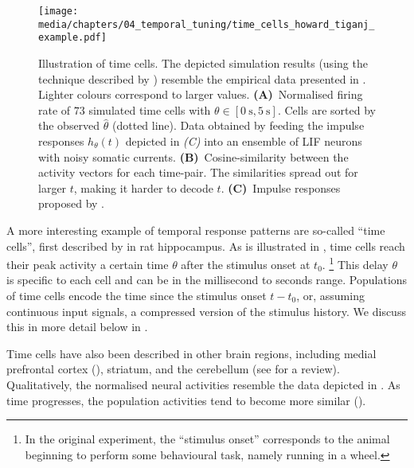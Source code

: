 \begin{figure}
	\centering
	\texttt{[image: media/chapters/04\_temporal\_tuning/time\_cells\_howard\_tiganj\_example.pdf]}%
	{\label{fig:time_cells_howard_tiganj_example_a}}%
	{\label{fig:time_cells_howard_tiganj_example_b}}%
	{\label{fig:time_cells_howard_tiganj_example_c}}%
	\caption[Illustration of time cells]{
		Illustration of time cells.
		The depicted simulation results (using the technique described by \cite{howard2014unified}) resemble the empirical data presented in \citet{tiganj2016sequential}.
		Lighter colours correspond to larger values.
		\textbf{(A)}~Normalised firing rate of $73$ simulated time cells with $\theta \in [\SI{0}{\second}, \SI{5}{\second}]$. Cells are sorted by the observed $\hat \theta$ (dotted line).
		Data obtained by feeding the impulse responses $h_\theta(t)$ depicted in \emph{(C)} into an ensemble of LIF neurons with noisy somatic currents.
		\textbf{(B)}~Cosine-similarity between the activity vectors for each time-pair. The similarities spread out for larger $t$, making it harder to decode $t$.
		\textbf{(C)}~Impulse responses proposed by \citet{howard2014unified}.
	}
	\label{fig:time_cells_howard_tiganj_example}
\end{figure}

A more interesting example of temporal response patterns are so-called \enquote{time cells}, first described by \citet{pastalkova2008internally} in rat hippocampus.
As is illustrated in , time cells reach their peak activity a certain time $\theta$ after the stimulus onset at $t_0$.%
\footnote{In the original \citet{pastalkova2008internally} experiment, the \enquote{stimulus onset} corresponds to the animal beginning to perform some behavioural task, namely running in a wheel.}
This delay $\theta$ is specific to each cell and can be in the millisecond to seconds range.
Populations of time cells encode the time since the stimulus onset $t - t_0$, or, assuming continuous input signals, a compressed version of the stimulus history.
We discuss this in more detail below in .

Time cells have also been described in other brain regions, including medial prefrontal cortex (\cite{tiganj2016sequential}), striatum, and the cerebellum (see \cite{lusk2016cerebellar} for a review).
Qualitatively, the normalised neural activities resemble the data depicted in .
As time progresses, the population activities tend to become more similar ().

